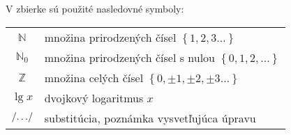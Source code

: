V zbierke sú použité nasledovné symboly:
\begin{center}
\begin{tabular}{cl}
$\mathbb{N}$ & množina prirodzených čísel $\left\{1,2,3\ldots\right\}$\\
$\mathbb{N}_0$ & množina prirodzených čísel s nulou $\left\{0,1,2,\ldots\right\}$\\
$\mathbb{Z}$ & množina celých čísel $\left\{0,\pm1,\pm2,\pm3\ldots\right\}$\\
$\lg x$ & dvojkový logaritmus $x$\\
$\left/\ldots\right/$ & substitúcia, poznámka vysvetľujúca úpravu
\end{tabular}
\end{center}
